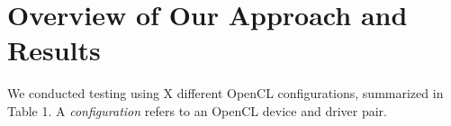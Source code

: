 \section{Overview of Our Approach and Results}\label{sec:overview}

We conducted testing using X different OpenCL configurations, summarized in Table 1. A \emph{configuration} refers to an OpenCL device and driver pair.

